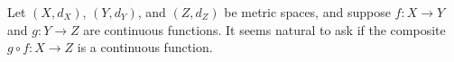 \begin{comment}

\ActivitySolution

	\ba
	\item  Let $a=(a_1,a_2) \in \R^2$ and let $\epsilon > 0$. Choose any $0 < \delta < \epsilon$. Let $x = (x_1,x_2)$ in $\R^2$ and suppose $d_T(x,a) < \delta$. Then
\[d_T(x,a) = | x_1-a_1\ | + | x_2-a_2 | < \delta = \epsilon.\]
It follows that
\begin{align*}
d_M(f(x), f(a)) &= d_M((x_1+x_2, x_1), (a_1+a_2, a_2)) \\
	&= \max\{ | (x_1+x_2)-(a_1+a_2) |, | x_2-a_2 | \} \\
	&= \max\{ | (x_1-a_1)+(x_2-a_2) |, | x_2-a_2 | \} \\
	&\leq \max\{ | x_1-a_1 | + | x_2-a_2 |, | x_2-a_2 | \} \\
	&= |x_1-a_1|+|x_2-a_2| < \epsilon.
	\end{align*}
Thus, the function $f$ is continuous at every point in $\R^2$ and is therefore a continuous function from $X$ to $Y$. 

	\item  Let $a=(a_1,a_2) \in \R^2$ and let $\epsilon > 0$. Choose any $0 < \delta < \frac{\epsilon}{3}$. Let $x = (x_1,x_2)$ in $\R^2$ and suppose $d_M(x,a) < \delta$. Then
\[d_M(x,a) = \max\{| x_1-a_1\ |, | x_2-a_2 |\} < \delta < \frac{\epsilon}{3}.\]
So $| x_1-a_1 | < \frac{\epsilon}{3}$ and $| x_2-a_2 | < \frac{\epsilon}{3}$. Then
\begin{align*}
d_T(f(x), f(a)) &= d_T((x_1+x_2, x_1), (a_1+a_2, a_2)) \\
	&= | (x_1+x_2)-(a_1+a_2) | + | x_2-a_2 |  \\
	&= | (x_1-a_1)+(x_2-a_2) | + | x_2-a_2 | \} \\
	&\leq \left(| x_1-a_1 | + | x_2-a_2 |\right) + | x_2-a_2 | \\
	&\leq \frac{\epsilon}{3}+\frac{\epsilon}{3} + \frac{\epsilon}{3}  \\
	&= \epsilon.
\end{align*}
Thus, the function $f$ is continuous at every point in $\R^2$ and is therefore a continuous function from $Y$ to $X$. 
	
	\ea

\end{comment}


Let $(X, d_X)$, $(Y,d_Y)$, and $(Z, d_Z)$ be metric spaces, and suppose $f: X \to Y$ and $g: Y \to Z$ are continuous functions. It seems natural to ask if the composite $g \circ f : X \to Z$ is a continuous function.

